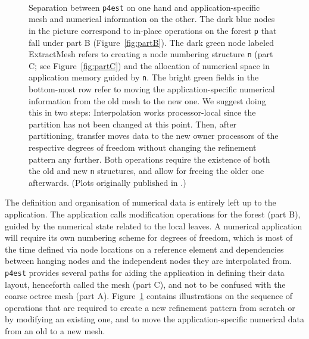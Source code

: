 \documentclass[letterpaper,11pt]{article}
\newcommand{\pforest}{\texttt{p4est}\xspace}
\newcommand{\figref}[1]{Figure~\ref{fig:#1}}
\begin{document}
\begin{figure}
\begin{center}
  \\
\end{center}
\caption{Separation between \pforest on one hand and application-specific mesh
  and numerical information on the other.
  The dark blue nodes in the picture correspond to in-place operations on the
  forest \texttt{p} that fall under part B (\figref{partB}).  The dark green node
  labeled
  ExtractMesh refers to creating a node numbering structure \texttt{n} (part C;
  see \figref{partC}) and the allocation of numerical space in application
  memory guided by \texttt{n}.  The bright green fields in the bottom-most row refer
  to moving the application-specific numerical information from the old mesh to
  the new one.  We suggest doing this in two steps: Interpolation works
  processor-local since the partition has not been changed at this point.  Then,
  after partitioning, transfer moves data to the new owner processors of the
  respective degrees of freedom without changing the refinement pattern any
  further.  Both operations require the existence of both the old and
  new \texttt{n} structures, and allow for freeing the older one afterwards.
  (Plots originally published in \cite{BursteddeGhattasStadlerEtAl08}.)
}%
\label{fig:meshes}%
\end{figure}%

The definition and organisation of numerical data is entirely left up to the
application.  The application calls modification operations for the forest
(part B), guided by the numerical state related to the local leaves.  A
numerical application will require its own numbering scheme for degrees of
freedom, which is most of the time defined via node locations on a reference
element and dependencies between hanging nodes and the independent nodes they
are interpolated from.  \pforest provides several paths for aiding the
application in defining their data layout, henceforth called the mesh (part C),
and not to be confused with the coarse octree mesh (part A).  \figref{meshes}
contains illustrations on the sequence of operations that are required to
create a new refinement pattern from scratch or by modifying an existing one,
and to move the application-specific numerical data from an old to a new mesh.



\end{document}
